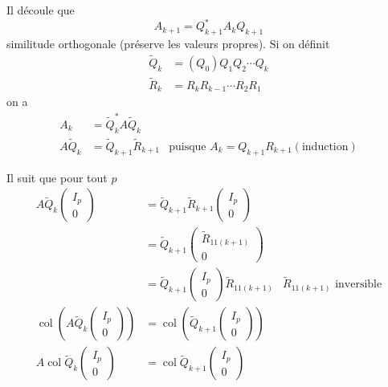 \documentclass[11pt,a4paper]{article}
\theoremstyle{definition}
\DeclareMathOperator{\col}{col}
\begin{document}
Il découle que
$$A_{k+1} = Q_{k+1}^*A_kQ_{k+1}$$
similitude orthogonale (préserve les valeurs propres).
Si on définit
\begin{align*}
  \tilde{Q}_k & = (Q_0)Q_1Q_2\cdots Q_k\\
  \tilde{R}_k & = R_kR_{k-1}\cdots R_2R_1
\end{align*}
on a
\begin{align*}
  A_k & = \tilde{Q}_k^* A \tilde{Q}_k\\
  A\tilde{Q}_k & = \tilde{Q}_{k+1} \tilde{R}_{k+1} & \text{puisque } A_k = Q_{k+1}R_{k+1} (\text{induction})
\end{align*}

Il suit que pour tout $p$
\begin{align*}
  A\tilde{Q}_k
  \begin{pmatrix}
    I_p\\
    0
  \end{pmatrix}
 & = \tilde{Q}_{k+1}\tilde{R}_{k+1}
 \begin{pmatrix}
   I_p\\
   0
 \end{pmatrix}\\
 & = \tilde{Q}_{k+1}
 \begin{pmatrix}
   \tilde{R}_{11(k+1)}\\
   0
 \end{pmatrix}\\
 & = \tilde{Q}_{k+1}
 \begin{pmatrix}
   I_p\\
   0
 \end{pmatrix}
  \tilde{R}_{11(k+1)} & \tilde{R}_{11(k+1)} \text{ inversible}\\
 \col\left(A \tilde{Q}_k
   \begin{pmatrix}
     I_p\\
     0
   \end{pmatrix}
 \right) & =
   \col  \left(
     \tilde{Q}_{k+1}
     \begin{pmatrix}
       I_p\\
       0
     \end{pmatrix}
   \right)\\
   A\col\tilde{Q}_k
   \begin{pmatrix}
     I_p\\
     0
   \end{pmatrix} & =
     \col
     \tilde{Q}_{k+1}
     \begin{pmatrix}
       I_p\\
       0
     \end{pmatrix}
\end{align*}
\end{document}
